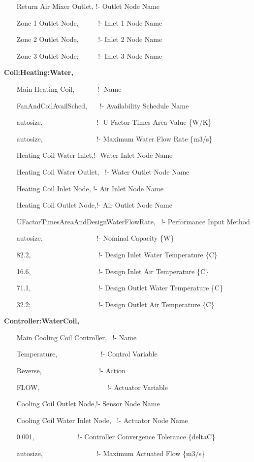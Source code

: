 ~~~ Return Air Mixer Outlet, !- Outlet Node Name

~~~ Zone 1 Outlet Node,~~~~~ !- Inlet 1 Node Name

~~~ Zone 2 Outlet Node,~~~~~ !- Inlet 2 Node Name

~~~ Zone 3 Outlet Node;~~~~~ !- Inlet 3 Node Name

\textbf{Coil:Heating:Water,}

~~~ Main Heating Coil,~~~~~~ !- Name

~~~ FanAndCoilAvailSched,~~~ !- Availability Schedule Name

~~~ autosize,~~~~~~~~~~~~~~~ !- U-Factor Times Area Value \{W/K\}

~~~ autosize,~~~~~~~~~~~~~~~ !- Maximum Water Flow Rate \{m3/s\}

~~~ Heating Coil Water Inlet,!- Water Inlet Node Name

~~~ Heating Coil Water Outlet,~ !- Water Outlet Node Name

~~~ Heating Coil Inlet Node, !- Air Inlet Node Name

~~~ Heating Coil Outlet Node,!- Air Outlet Node Name

~~~ UFactorTimesAreaAndDesignWaterFlowRate,~ !- Performance Input Method

~~~ autosize,~~~~~~~~~~~~~~~ !- Nominal Capacity \{W\}

~~~ 82.2,~~~~~~~~~~~~~~~~~~~ !- Design Inlet Water Temperature \{C\}

~~~ 16.6,~~~~~~~~~~~~~~~~~~~ !- Design Inlet Air Temperature \{C\}

~~~ 71.1,~~~~~~~~~~~~~~~~~~~ !- Design Outlet Water Temperature \{C\}

~~~ 32.2;~~~~~~~~~~~~~~~~~~~ !- Design Outlet Air Temperature \{C\}

\textbf{Controller:WaterCoil,}

~~~ Main Cooling Coil Controller,~ !- Name

~~~ Temperature,~~~~~~~~~~~~ !- Control Variable

~~~ Reverse,~~~~~~~~~~~~~~~~ !- Action

~~~ FLOW,~~~~~~~~~~~~~~~~~~~ !- Actuator Variable

~~~ Cooling Coil Outlet Node,!- Sensor Node Name

~~~ Cooling Coil Water Inlet Node, ~!- Actuator Node Name

~~~ 0.001,~~~~~~~~~~~~ !- Controller Convergence Tolerance \{deltaC\}

~~~ autosize,~~~~~~~~~~~~~~~ !- Maximum Actuated Flow \{m3/s\}

